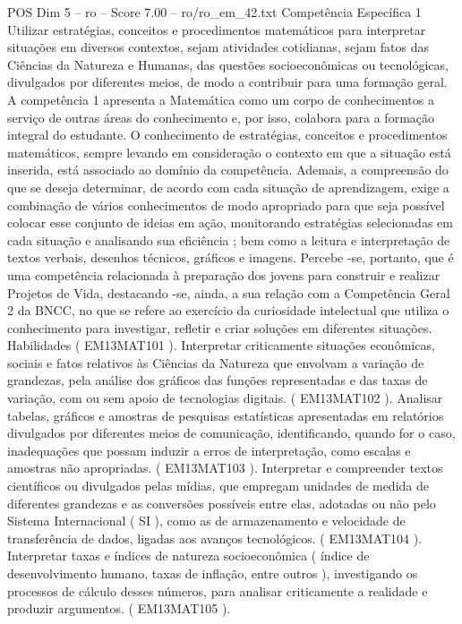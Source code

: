 \begin{textsample}{POS Dim 5 – ro – Score 7.00 – ro/ro\_em\_42.txt}  \label{ex:f5_pos_120}
Competência Específica 1 Utilizar estratégias, conceitos e procedimentos matemáticos para interpretar situações em diversos contextos, sejam atividades cotidianas, sejam fatos das Ciências da Natureza e Humanas, das questões socioeconômicas ou tecnológicas, divulgados por diferentes meios, de modo a contribuir para uma formação geral.
A competência 1 apresenta a Matemática como um corpo de conhecimentos a serviço de outras áreas do conhecimento e, por isso, colabora para a formação integral do estudante.
O conhecimento de estratégias, conceitos e procedimentos matemáticos, sempre levando em consideração o contexto em que a situação está inserida, está associado ao domínio da competência.
Ademais, a compreensão do que se deseja determinar, de acordo com cada situação de aprendizagem, exige a combinação de vários conhecimentos de modo apropriado para que seja possível colocar esse conjunto de ideias em ação, monitorando estratégias selecionadas em cada situação e analisando sua eficiência ; bem como a leitura e interpretação de textos verbais, desenhos técnicos, gráficos e imagens.
Percebe -se, portanto, que é uma competência relacionada à preparação dos jovens para construir e realizar Projetos de Vida, destacando -se, ainda, a sua relação com a Competência Geral 2 da BNCC, no que se refere ao exercício da curiosidade intelectual que utiliza o conhecimento para investigar, refletir e criar soluções em diferentes situações.
Habilidades ( EM13MAT101 ).
Interpretar criticamente situações econômicas, sociais e fatos relativos às Ciências da Natureza que envolvam a variação de grandezas, pela análise dos gráficos das funções representadas e das taxas de variação, com ou sem apoio de tecnologias digitais. ( EM13MAT102 ).
Analisar tabelas, gráficos e amostras de pesquisas estatísticas apresentadas em relatórios divulgados por diferentes meios de comunicação, identificando, quando for o caso, inadequações que possam induzir a erros de interpretação, como escalas e amostras não apropriadas. ( EM13MAT103 ).
Interpretar e compreender textos científicos ou divulgados pelas mídias, que empregam unidades de medida de diferentes grandezas e as conversões possíveis entre elas, adotadas ou não pelo Sistema Internacional ( SI ), como as de armazenamento e velocidade de transferência de dados, ligadas aos avanços tecnológicos. ( EM13MAT104 ).
Interpretar taxas e índices de natureza socioeconômica ( índice de desenvolvimento humano, taxas de inflação, entre outros ), investigando os processos de cálculo desses números, para analisar criticamente a realidade e produzir argumentos. ( EM13MAT105 ).

\end{textsample}
